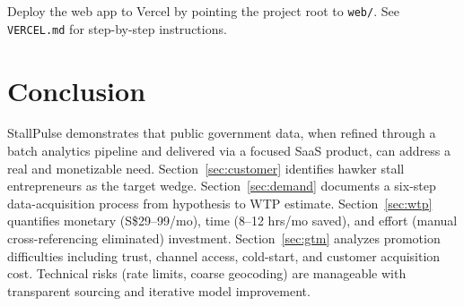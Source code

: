 \documentclass[11pt,a4paper]{article}
\begin{document}
Deploy the web app to Vercel by pointing the project root to \texttt{web/}. See \texttt{VERCEL.md} for step-by-step instructions.

\section{Conclusion}

StallPulse demonstrates that public government data, when refined through a batch analytics pipeline and delivered via a focused SaaS product, can address a real and monetizable need. Section~\ref{sec:customer} identifies hawker stall entrepreneurs as the target wedge. Section~\ref{sec:demand} documents a six-step data-acquisition process from hypothesis to WTP estimate. Section~\ref{sec:wtp} quantifies monetary (S\$29--99/mo), time (8--12 hrs/mo saved), and effort (manual cross-referencing eliminated) investment. Section~\ref{sec:gtm} analyzes promotion difficulties including trust, channel access, cold-start, and customer acquisition cost. Technical risks (rate limits, coarse geocoding) are manageable with transparent sourcing and iterative model improvement.
\end{document}
